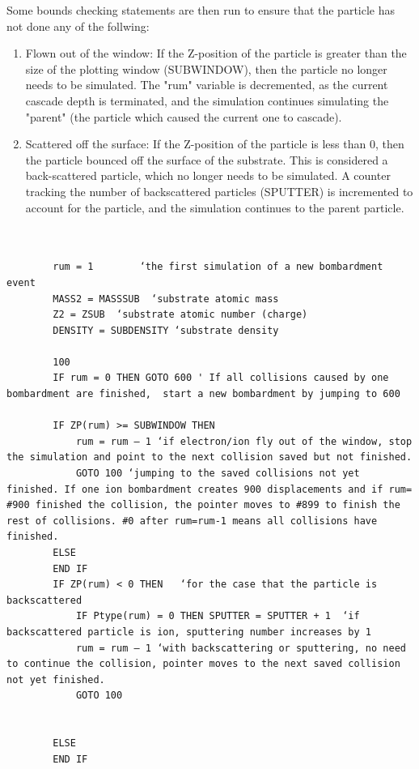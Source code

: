 \documentclass[10pt, reqno]{exam}
\begin{document}
Some bounds checking statements are then run to ensure that the particle has not done any of the follwing:

\begin{enumerate}
    \item Flown out of the window: If the Z-position of the particle is greater than the size of the plotting window (SUBWINDOW), then the particle no longer needs to be simulated. The "rum" variable is decremented, as the current cascade depth is terminated, and the simulation continues simulating the "parent" (the particle which caused the current one to cascade).
    \item Scattered off the surface: If the Z-position of the particle is less than 0, then the particle bounced off the surface of the substrate. This is considered a back-scattered particle, which no longer needs to be simulated. A counter tracking the number of backscattered particles (SPUTTER) is incremented to account for the particle, and the simulation continues to the parent particle.
\end{enumerate}

\begin{verbatim}
    

        rum = 1        ‘the first simulation of a new bombardment event 
        MASS2 = MASSSUB  ‘substrate atomic mass
        Z2 = ZSUB  ‘substrate atomic number (charge)
        DENSITY = SUBDENSITY ‘substrate density
    
        100
        IF rum = 0 THEN GOTO 600 ' If all collisions caused by one bombardment are finished,  start a new bombardment by jumping to 600
    
        IF ZP(rum) >= SUBWINDOW THEN 
            rum = rum – 1 ‘if electron/ion fly out of the window, stop the simulation and point to the next collision saved but not finished. 
            GOTO 100 ‘jumping to the saved collisions not yet finished. If one ion bombardment creates 900 displacements and if rum= #900 finished the collision, the pointer moves to #899 to finish the rest of collisions. #0 after rum=rum-1 means all collisions have finished. 
        ELSE
        END IF
        IF ZP(rum) < 0 THEN   ‘for the case that the particle is backscattered
            IF Ptype(rum) = 0 THEN SPUTTER = SPUTTER + 1  ‘if backscattered particle is ion, sputtering number increases by 1
            rum = rum – 1 ‘with backscattering or sputtering, no need to continue the collision, pointer moves to the next saved collision not yet finished. 
            GOTO 100
    
    
        ELSE
        END IF
\end{verbatim}
\end{document}
